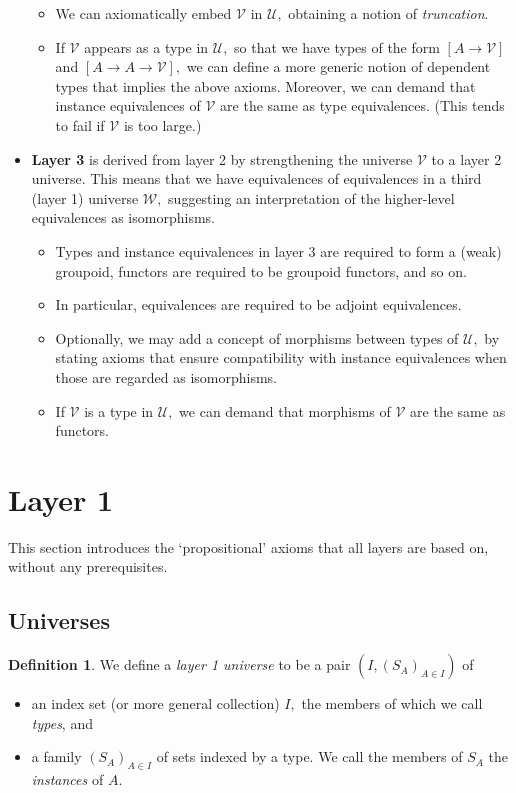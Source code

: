 \documentclass[a4paper]{article}
\theoremstyle{definition}
\newtheorem{definition}{Definition}[section]
\theoremstyle{remark}
\newcommand{\defn}{\emph}
\newcommand{\U}{\mathcal{U}}
\newcommand{\V}{\mathcal{V}}
\newcommand{\W}{\mathcal{W}}
\begin{document}
\begin{itemize}
\begin{itemize}
    \item We can axiomatically embed $\V$ in $\U,$ obtaining a notion of \defn{truncation}.
    \item If $\V$ appears as a type in $\U,$ so that we have types of the form $[A \to \V]$ and
    $[A \to A \to \V],$ we can define a more generic notion of dependent types that implies the
    above axioms. Moreover, we can demand that instance equivalences of $\V$ are the same as type
    equivalences. (This tends to fail if $\V$ is too large.)
  \end{itemize}
  \item \textbf{Layer 3} is derived from layer 2 by strengthening the universe $\V$ to a layer 2
  universe. This means that we have equivalences of equivalences in a third (layer 1) universe $\W,$
  suggesting an interpretation of the higher-level equivalences as isomorphisms.
  \begin{itemize}
    \item Types and instance equivalences in layer 3 are required to form a (weak) groupoid,
    functors are required to be groupoid functors, and so on.
    \item In particular, equivalences are required to be adjoint equivalences.
    \item Optionally, we may add a concept of morphisms between types of $\U,$ by stating axioms
    that ensure compatibility with instance equivalences when those are regarded as isomorphisms.
    \item If $\V$ is a type in $\U,$ we can demand that morphisms of $\V$ are the same as functors.
  \end{itemize}
\end{itemize}

\section{Layer 1}

This section introduces the `propositional' axioms that all layers are based on, without any
prerequisites.

\subsection{Universes}
\label{sec:layer1-universes}

\begin{definition}
  \label{def:layer1-universe}
  We define a \defn{layer 1 universe} to be a pair $(I, (S_A)_{A \in I})$ of
  \begin{itemize}
    \item an index set (or more general collection) $I,$ the members of which we call \defn{types},
    and
    \item a family $(S_A)_{A \in I}$ of sets indexed by a type. We call the members of $S_A$ the
    \defn{instances} of $A.$
  \end{itemize}
\end{definition}
\end{document}
